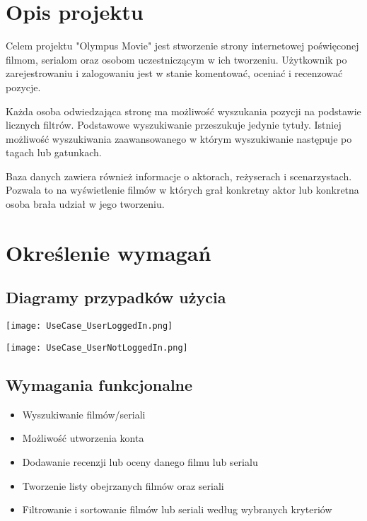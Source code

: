 \documentclass[12pt]{article}
\begin{document}

	\section{Opis projektu}
	Celem projektu "Olympus Movie" jest stworzenie strony internetowej poświęconej filmom, serialom oraz osobom uczestniczącym w ich tworzeniu. Użytkownik po zarejestrowaniu i zalogowaniu jest w stanie komentować, oceniać i recenzować pozycje.
	
	Każda osoba odwiedzająca stronę ma możliwość wyszukania pozycji na podstawie licznych filtrów. Podstawowe wyszukiwanie przeszukuje jedynie tytuły. Istniej możliwość wyszukiwania zaawansowanego w którym wyszukiwanie następuje po tagach lub gatunkach.
	
	Baza danych zawiera również informacje o aktorach, reżyserach i scenarzystach. Pozwala to na wyświetlenie filmów w których grał konkretny aktor lub konkretna osoba brała udział w jego tworzeniu.
	\section{Określenie wymagań}
		\subsection{Diagramy przypadków użycia}
			\texttt{[image: UseCase\_UserLoggedIn.png]}
			
			\texttt{[image: UseCase\_UserNotLoggedIn.png]}
		\subsection{Wymagania funkcjonalne}
			\begin{itemize}
				\item Wyszukiwanie filmów/seriali
				\item Możliwość utworzenia konta
				\item Dodawanie recenzji lub oceny danego filmu lub serialu
				\item Tworzenie listy obejrzanych filmów oraz seriali
				\item Filtrowanie i sortowanie filmów lub seriali według wybranych kryteriów
			\end{itemize}
\end{document}

